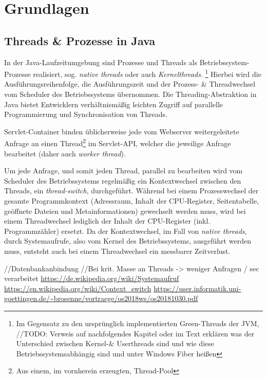
\section{Grundlagen}
\label{section:grundlagen}

\subsection{Threads \& Prozesse in Java}
\label{sections:treads_prozesse}
In der Java-Laufzeitumgebung sind Prozesse und Threads als Betriebssystem-Prozesse realisiert, sog. \textit{native threads} oder auch \textit{Kernelthreads}.
\footnote{Im Gegensatz zu den ursprünglich implementierten Green-Threads der JVM, //TODO: Verweis auf nachfolgendes Kapitel oder im Text erklären was der Unterschied zwischen Kernel-& Userthreads sind und wie diese Betriebssystemsabhängig sind und unter Windows Fiber heißen}
Hierbei wird die Ausführungsreihenfolge, die Ausführungszeit und der Prozess- \& Threadwechsel vom Scheduler des Betriebssystems übernommen.
Die Threading-Abstraktion in Java bietet Entwicklern verhältnismäßig leichten Zugriff auf parallelle Programmierung und Synchronisation von Threads.

Servlet-Container binden üblicherweise jede vom Webserver weitergeleitete Anfrage an einen
Thread\footnote{Aus einem, im vornherein erzeugten, Thread-Pool} im Servlet-API, welcher die jeweilige Anfrage bearbeitet
(daher auch \textit{worker thread}).

Um jede Anfrage, und somit jeden Thread, parallel zu bearbeiten wird vom Scheduler des Betriebssystems regelmäßig ein Kontextwechsel zwischen den Threads,
ein \textit{thread-switch}, durchgeführt. Während bei einem Prozesswechsel der gesamte Programmkontext (Adressraum, Inhalt der CPU-Register,
Seitentabelle, geöffnete Dateien und Metainformationen)
gewechselt werden muss, wird bei einem Threadwechsel lediglich der Inhalt der CPU-Register (inkl. Programmzähler) ersetzt.
Da der Kontextwechsel, im Fall von \textit{native threads}, durch Systemaufrufe, also vom Kernel des Betriebssystems, ausgeführt werden muss, entsteht auch
bei einem Threadwechsel ein messbarer Zeitverlust.

//Datenbankanbindung
//Bei krit. Masse an Threads -> weniger Anfragen / sec verarbeitet
\url{https://de.wikipedia.org/wiki/Systemaufruf}
\url {https://en.wikipedia.org/wiki/Context_switch}
\url{https://user.informatik.uni-goettingen.de/~brosenne/vortraege/os2018ws/os20181030.pdf}


